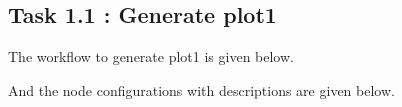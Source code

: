 \documentclass[11pt]{article}
\begin{document}
		\subsection*{Task 1.1 : Generate plot1}
			The workflow to generate plot1 is given below.

			And the node configurations with descriptions are given below.
			\iffalse
\end{document}
